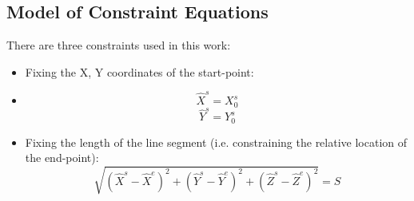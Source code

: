 

\subsection{Model of Constraint Equations}
\label{subsec:ConEqua}
There are three constraints used in this work:
\begin{itemize}
\item Fixing the X, Y coordinates of the start-point:
\item [] \begin{equation} \label{eq:constraint1}
\hat{X}^s=X^s_0
\end{equation}
\begin{equation} \label{eq:constraint2}
\hat{Y}^s=Y^s_0
\end{equation}
\item Fixing the length of the line segment (i.e. constraining the relative location of the end-point):
\begin{equation} \label{eq:constraint3}
\sqrt{(\hat{X}^s-\hat{X}^e)^2+(\hat{Y}^s-\hat{Y}^e)^2+(\hat{Z}^s-\hat{Z}^e)^2}=S
\end{equation}
\end{itemize}

